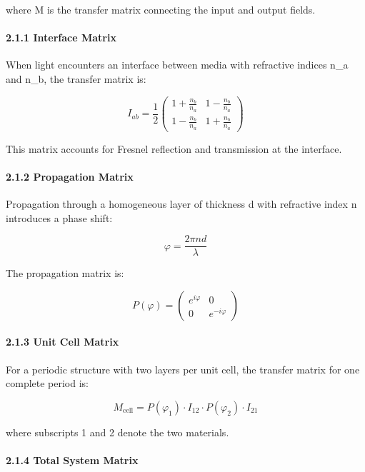 \documentclass[
]{article}
\begin{document}
where M is the transfer matrix connecting the input and output fields.

\paragraph{2.1.1 Interface Matrix}\label{interface-matrix}

When light encounters an interface between media with refractive indices
n\_a and n\_b, the transfer matrix is:

\[I_{ab} = \frac{1}{2}\begin{pmatrix} 1 + \frac{n_b}{n_a} & 1 - \frac{n_b}{n_a} \\ 1 - \frac{n_b}{n_a} & 1 + \frac{n_b}{n_a} \end{pmatrix}\]

This matrix accounts for Fresnel reflection and transmission at the
interface.

\paragraph{2.1.2 Propagation Matrix}\label{propagation-matrix}

Propagation through a homogeneous layer of thickness d with refractive
index n introduces a phase shift:

\[\varphi = \frac{2\pi n d}{\lambda}\]

The propagation matrix is:

\[P(\varphi) = \begin{pmatrix} e^{i\varphi} & 0 \\ 0 & e^{-i\varphi} \end{pmatrix}\]

\paragraph{2.1.3 Unit Cell Matrix}\label{unit-cell-matrix}

For a periodic structure with two layers per unit cell, the transfer
matrix for one complete period is:

\[M_{\text{cell}} = P(\varphi_1) \cdot I_{12} \cdot P(\varphi_2) \cdot I_{21}\]

where subscripts 1 and 2 denote the two materials.

\paragraph{2.1.4 Total System Matrix}\label{total-system-matrix}
\end{document}
